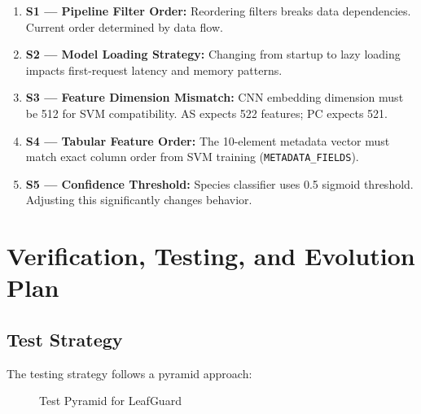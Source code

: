 \documentclass[11pt,a4paper,oneside]{report}
\newcommand{\code}[1]{\texttt{\footnotesize #1}}
\begin{document}
\begin{enumerate}
  \item \textbf{S1 --- Pipeline Filter Order:} Reordering filters breaks data dependencies. Current order determined by data flow.
  \item \textbf{S2 --- Model Loading Strategy:} Changing from startup to lazy loading impacts first-request latency and memory patterns.
  \item \textbf{S3 --- Feature Dimension Mismatch:} CNN embedding dimension must be 512 for SVM compatibility. AS expects 522 features; PC expects 521.
  \item \textbf{S4 --- Tabular Feature Order:} The 10-element metadata vector must match exact column order from SVM training (\code{METADATA\_FIELDS}).
  \item \textbf{S5 --- Confidence Threshold:} Species classifier uses 0.5 sigmoid threshold. Adjusting this significantly changes behavior.
\end{enumerate}


\chapter{Verification, Testing, and Evolution Plan}

\section{Test Strategy}

The testing strategy follows a pyramid approach:

\begin{figure}[H]
\centering
{}
\caption{Test Pyramid for LeafGuard}
\label{fig:test-pyramid}
\end{figure}
\end{document}
